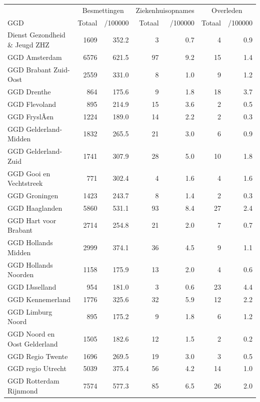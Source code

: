 \documentclass[
  english,
  man,floatsintext]{apa6}
\begin{document}
\begin{table}[H]
\centering\begingroup\fontsize{10}{12}\selectfont

\begin{threeparttable}
\begin{tabular}{lrrrrrr}
\toprule
\multicolumn{1}{c}{ } & \multicolumn{2}{c}{Besmettingen} & \multicolumn{2}{c}{Ziekenhuisopnames} & \multicolumn{2}{c}{Overleden} \\
\cmidrule(l{3pt}r{3pt}){2-3} \cmidrule(l{3pt}r{3pt}){4-5} \cmidrule(l{3pt}r{3pt}){6-7}
GGD & Totaal & /100000 & Totaal & /100000 & Totaal & /100000\\
\midrule
Dienst Gezondheid \& Jeugd ZHZ & 1609 & 352.2 & 3 & 0.7 & 4 & 0.9\\
GGD Amsterdam & 6576 & 621.5 & 97 & 9.2 & 15 & 1.4\\
GGD Brabant Zuid-Oost & 2559 & 331.0 & 8 & 1.0 & 9 & 1.2\\
GGD Drenthe & 864 & 175.6 & 9 & 1.8 & 18 & 3.7\\
GGD Flevoland & 895 & 214.9 & 15 & 3.6 & 2 & 0.5\\
GGD FryslÃ¢n & 1224 & 189.0 & 14 & 2.2 & 2 & 0.3\\
GGD Gelderland-Midden & 1832 & 265.5 & 21 & 3.0 & 6 & 0.9\\
GGD Gelderland-Zuid & 1741 & 307.9 & 28 & 5.0 & 10 & 1.8\\
GGD Gooi en Vechtstreek & 771 & 302.4 & 4 & 1.6 & 4 & 1.6\\
GGD Groningen & 1423 & 243.7 & 8 & 1.4 & 2 & 0.3\\
GGD Haaglanden & 5860 & 531.1 & 93 & 8.4 & 27 & 2.4\\
GGD Hart voor Brabant & 2714 & 254.8 & 21 & 2.0 & 7 & 0.7\\
GGD Hollands Midden & 2999 & 374.1 & 36 & 4.5 & 9 & 1.1\\
GGD Hollands Noorden & 1158 & 175.9 & 13 & 2.0 & 4 & 0.6\\
GGD IJsselland & 954 & 181.0 & 3 & 0.6 & 23 & 4.4\\
GGD Kennemerland & 1776 & 325.6 & 32 & 5.9 & 12 & 2.2\\
GGD Limburg Noord & 895 & 175.2 & 9 & 1.8 & 6 & 1.2\\
GGD Noord en Oost Gelderland & 1505 & 182.6 & 12 & 1.5 & 2 & 0.2\\
GGD Regio Twente & 1696 & 269.5 & 19 & 3.0 & 3 & 0.5\\
GGD regio Utrecht & 5039 & 375.4 & 56 & 4.2 & 14 & 1.0\\
GGD Rotterdam Rijnmond & 7574 & 577.3 & 85 & 6.5 & 26 & 2.0\\

\end{tabular}
\end{threeparttable}
\end{table}
\end{document}
